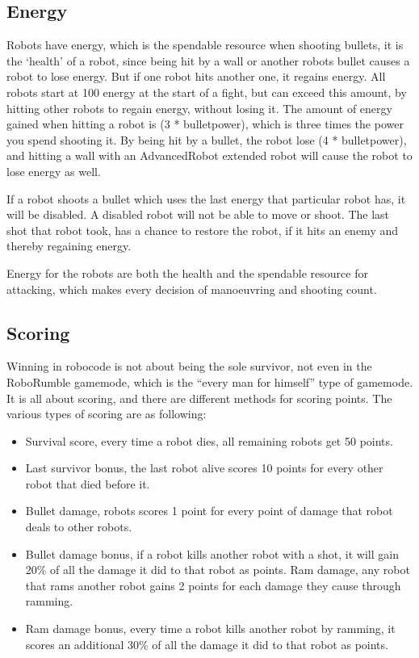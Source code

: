 \subsection{Energy}
Robots have energy, which is the spendable resource when shooting bullets, it is the ‘health’ of a robot, since being hit by a wall or another robots bullet causes a robot to lose energy. But if one robot hits another one, it regains energy. All robots start at 100 energy at the start of a fight, but can exceed this amount, by hitting other robots to regain energy, without losing it. The amount of energy gained when hitting a robot is (3 * bulletpower), which is three times the power you spend shooting it. By being hit by a bullet, the robot lose (4 * bulletpower), and hitting a wall with an AdvancedRobot extended robot will cause the robot to lose energy as well.

If a robot shoots a bullet which uses the last energy that particular robot has, it will be disabled. A disabled robot will not be able to move or shoot. The last shot that robot took, has a chance to restore the robot, if it hits an enemy and thereby regaining energy.
   
Energy for the robots are both the health and the spendable resource for attacking, which makes every decision of manoeuvring and shooting count.

\subsection{Scoring}
Winning in robocode is not about being the sole survivor, not even in the RoboRumble gamemode, which is the “every man for himself” type of gamemode. It is all about scoring, and there are different methods for scoring points. The various types of scoring are as following:
\begin{itemize}
\item Survival score, every time a robot dies, all remaining robots get 50 points.
\item Last survivor bonus, the last robot alive scores 10 points for every other robot that died before it.
\item Bullet damage, robots scores 1 point for every point of damage that robot deals to other robots.
\item Bullet damage bonus, if a robot kills another robot with a shot, it will gain 20\% of all the damage it did to that robot as points.
Ram damage, any robot that rams another robot gains 2 points for each damage they cause through ramming.
\item Ram damage bonus, every time a robot kills another robot by ramming, it scores an additional 30\% of all the damage it did to that robot as points.
\end{itemize}

